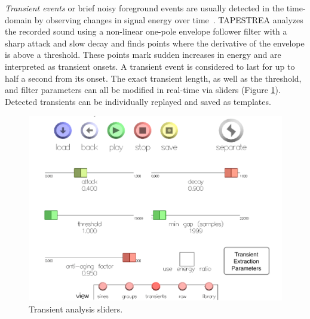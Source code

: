 \documentclass[10pt,letterpaper]{article}
\begin{document}

\textit{Transient events} or brief noisy foreground events are usually
detected in the time-domain by observing changes in signal energy over
time~. TAPESTREA analyzes the recorded sound
using a non-linear one-pole envelope follower filter with a sharp attack
and slow decay and finds points where the derivative of the envelope is
above a threshold. These points mark sudden increases in energy and are
interpreted as transient onsets. A transient event is considered to last
for up to half a second from its onset. The exact transient length, as
well as the threshold, and filter parameters can all be modified in
real-time via sliders (Figure \ref{fig:ui_sliders_tran}). Detected
transients can be individually replayed and saved as templates. 

\begin{figure}[h]
  \begin{center}
    \includegraphics[width=1\columnwidth]{ui_sliders3_w.pdf}
    \caption{Transient analysis sliders.} 
    \label{fig:ui_sliders_tran}
  \end{center}
\end{figure}
\end{document}
